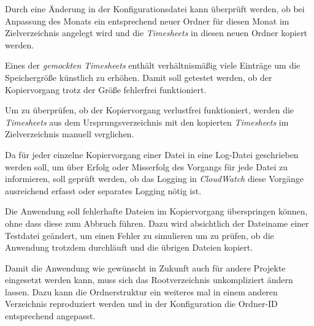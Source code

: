 Durch eine Änderung in der Konfigurationsdatei kann überprüft werden, ob bei Anpassung des Monats ein entsprechend neuer Ordner für diesen Monat im Zielverzeichnis angelegt wird und die \textit{\glspl{Timesheet}} in diesen neuen Ordner kopiert werden.

Eines der \textit{gemockten} \textit{\glspl{Timesheet}} enthält verhältnismäßig viele Einträge um die Speichergröße künstlich zu erhöhen. Damit soll getestet werden, ob der Kopiervorgang trotz der Größe fehlerfrei funktioniert.

Um zu überprüfen, ob der Kopiervorgang verlustfrei funktioniert, werden die \textit{\glspl{Timesheet}} aus dem Ursprungsverzeichnis mit den kopierten \textit{\glspl{Timesheet}} im Zielverzeichnis manuell verglichen.

Da für jeder einzelne Kopiervorgang einer Datei in eine Log-Datei geschrieben werden soll, um über Erfolg oder Misserfolg des Vorgangs für jede Datei zu informieren, soll geprüft werden, ob das Logging in \textit{CloudWatch} diese Vorgänge ausreichend erfasst oder separates Logging nötig ist.

Die Anwendung soll fehlerhafte Dateien im Kopiervorgang überspringen können, ohne dass diese zum Abbruch führen. Dazu wird absichtlich der Dateiname einer Testdatei geändert, um einen Fehler zu simulieren um zu prüfen, ob die Anwendung trotzdem durchläuft und die übrigen Dateien kopiert.

Damit die Anwendung wie gewünscht in Zukunft auch für andere Projekte eingesetzt werden kann, muss sich das Rootverzeichnis unkompliziert ändern lassen. Dazu kann die Ordnerstruktur ein weiteres mal in einem anderen Verzeichnis reproduziert  werden und in der Konfiguration die Ordner-ID entsprechend angepasst.


\pagebreak

